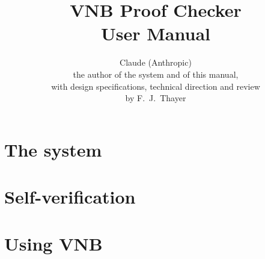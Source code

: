 \documentclass{amsbook}[openany]
\title{\textbf{VNB Proof Checker}\\[4pt]
       \large User Manual}
\author{Claude (Anthropic)\\[6pt]
  {\normalfont\normalsize the author of the system and of this manual,\\
   with design specifications, technical direction and review\\
   by F.~J.~Thayer}}
\date{}
\theoremstyle{definition}
\theoremstyle{remark}
\theoremstyle{remark}
\renewcommand{\[}{\par\smallskip\begin{lrbox}{\VNBdispbox}$\displaystyle}
\renewcommand{\]}{$\end{lrbox}%
    \noindent
    \ifdim\wd\VNBdispbox>\linewidth
      \resizebox{\linewidth}{!}{\usebox{\VNBdispbox}}%
    \else
      \hbox to \linewidth{\hfil\usebox{\VNBdispbox}\hfil}%
    \fi
    \par\smallskip}
\begin{document}
\maketitle
\tableofcontents
\newpage



\part{The system}\label{part:system}















\part{Self-verification}\label{part:meta}











\part{Using VNB}\label{part:using}


\end{document}
